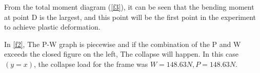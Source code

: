 From the total moment diagram (\autoref{f3}), it can be seen that the bending moment at point D is the largest, and this point will be the first point in the experiment to achieve plastic deformation.

In \autoref{f2}, The P-W graph is piecewise and if the combination of the P and W exceeds the closed figure on the left, The collapse will happen. In this case$(y=x)$, the collapse load for the frame was $W=148.63N,P=148.63N$.





